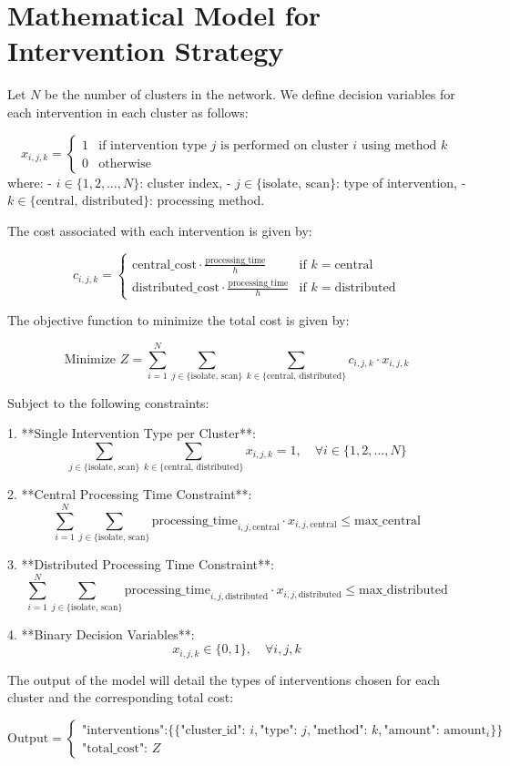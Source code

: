 \documentclass{article}
\begin{document}
\section*{Mathematical Model for Intervention Strategy}

Let \( N \) be the number of clusters in the network. We define decision variables for each intervention in each cluster as follows:

\[
x_{i,j,k} =
\begin{cases}
1 & \text{if intervention type } j \text{ is performed on cluster } i \text{ using method } k \\
0 & \text{otherwise}
\end{cases}
\]
where:
- \( i \in \{1, 2, \ldots, N\} \): cluster index,
- \( j \in \{ \text{isolate, scan} \} \): type of intervention,
- \( k \in \{ \text{central, distributed} \} \): processing method.

The cost associated with each intervention is given by:

\[
c_{i,j,k} =
\begin{cases}
\text{central\_cost} \cdot \frac{\text{processing\_time}}{h} & \text{if } k = \text{central} \\
\text{distributed\_cost} \cdot \frac{\text{processing\_time}}{h} & \text{if } k = \text{distributed}
\end{cases}
\]

The objective function to minimize the total cost is given by:

\[
\text{Minimize } Z = \sum_{i=1}^{N} \sum_{j \in \{ \text{isolate, scan} \}} \sum_{k \in \{ \text{central, distributed} \}} c_{i,j,k} \cdot x_{i,j,k}
\]

Subject to the following constraints:

1. **Single Intervention Type per Cluster**:
   \[
   \sum_{j \in \{ \text{isolate, scan} \}} \sum_{k \in \{ \text{central, distributed} \}} x_{i,j,k} = 1, \quad \forall i \in \{1, 2, \ldots, N\}
   \]

2. **Central Processing Time Constraint**:
   \[
   \sum_{i=1}^{N} \sum_{j \in \{ \text{isolate, scan} \}} \text{processing\_time}_{i,j,\text{central}} \cdot x_{i,j,\text{central}} \leq \text{max\_central}
   \]

3. **Distributed Processing Time Constraint**:
   \[
   \sum_{i=1}^{N} \sum_{j \in \{ \text{isolate, scan} \}} \text{processing\_time}_{i,j,\text{distributed}} \cdot x_{i,j,\text{distributed}} \leq \text{max\_distributed}
   \]

4. **Binary Decision Variables**:
   \[
   x_{i,j,k} \in \{0, 1\}, \quad \forall i, j, k
   \]

The output of the model will detail the types of interventions chosen for each cluster and the corresponding total cost:

\[
\text{Output} =
\begin{cases}
\text{"interventions":} \{ \{ \text{"cluster\_id": } i, \text{"type": } j, \text{"method": } k, \text{"amount": } \text{amount}_i \} \} \\
\text{"total\_cost": } Z
\end{cases}
\]
\end{document}
